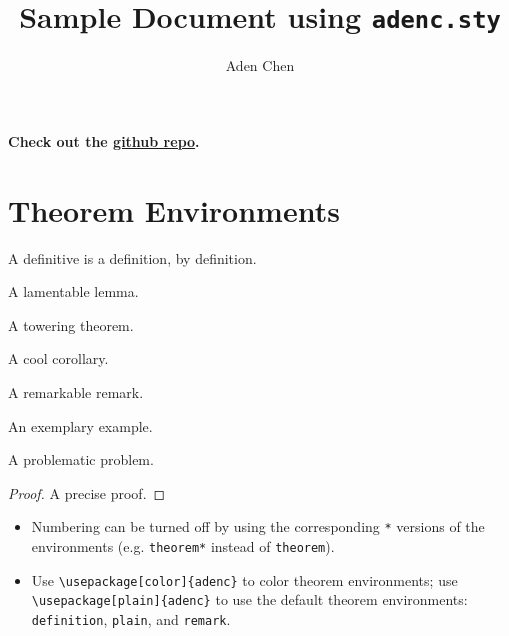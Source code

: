 \documentclass[10pt,letterpaper]{amsart}
\title{Sample Document using \texttt{adenc.sty}}
\author{Aden Chen}
\begin{document}
\maketitle

\tableofcontents

\noindent
\textbf{Check out the \href{https://github.com/AdenChen27/latex}{github repo}. }

\section{Theorem Environments}

\begin{definition}
  A definitive  is a definition, by definition. 
\end{definition}

\begin{lemma}
  A lamentable lemma. 
\end{lemma}

\begin{theorem}
  A towering theorem. 
\end{theorem}

\begin{corollary}
  A cool corollary. 
\end{corollary}

\begin{remark}
  A remarkable remark. 
\end{remark}

\begin{example}
  An exemplary example. 
\end{example}

\begin{problem}
  A problematic problem. 
\end{problem}

\begin{proof}
  A precise proof.
\end{proof}

\begin{itemize}
  \item Numbering can be turned off by using the corresponding \verb|*| versions of the environments (e.g. \verb|theorem*| instead of \verb|theorem|). 
  \item Use \verb|\usepackage[color]{adenc}| to color theorem environments; use \verb|\usepackage[plain]{adenc}|  to use the default theorem environments: \texttt{definition}, \texttt{plain}, and \texttt{remark}.
\end{itemize}
\end{document}
